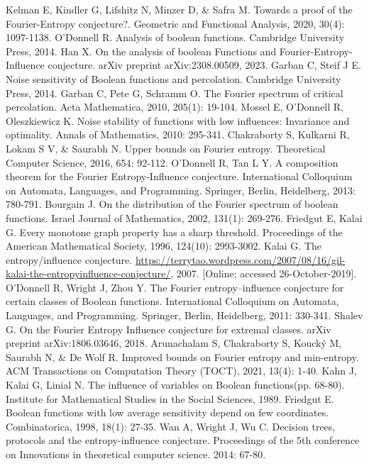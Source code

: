 \documentclass[10pt]{article} \usepackage[utf8]{inputenc}
\theoremstyle{definition}
\theoremstyle{remark}
\numberwithin{equation}{section}
\begin{document}
\raggedright
\sloppy
\begin{thebibliography}{19}
Kelman E, Kindler G, Lifshitz N, Minzer D, \& Safra M. Towards a proof of the Fourier-Entropy conjecture?. Geometric and Functional Analysis, 2020, 30(4): 1097-1138.
O'Donnell R. Analysis of boolean functions. Cambridge University Press, 2014.
Han X. On the analysis of boolean Functions and Fourier-Entropy-Influence conjecture. arXiv preprint arXiv:2308.00509, 2023.
Garban C, Steif J E. Noise sensitivity of Boolean functions and percolation. Cambridge University Press, 2014.
Garban C, Pete G, Schramm O. The Fourier spectrum of critical percolation. Acta Mathematica, 2010, 205(1): 19-104.
Mossel E, O'Donnell R, Oleszkiewicz K. Noise stability of functions with low influences: Invariance and optimality. Annals of Mathematics, 2010: 295-341.
Chakraborty S, Kulkarni R, Lokam S V, \& Saurabh N. Upper bounds on Fourier entropy. Theoretical Computer Science, 2016, 654: 92-112.
O’Donnell R, Tan L Y. A composition theorem for the Fourier Entropy-Influence conjecture. International Colloquium on Automata, Languages, and Programming. Springer, Berlin, Heidelberg, 2013: 780-791.
Bourgain J. On the distribution of the Fourier spectrum of boolean functions. Israel Journal of Mathematics, 2002, 131(1): 269-276.
Friedgut E, Kalai G. Every monotone graph property has a sharp threshold. Proceedings of the American Mathematical Society, 1996, 124(10): 2993-3002.
Kalai G. The entropy/influence conjecture. \url{https://terrytao.wordpress.com/2007/08/16/gil-kalai-the-entropyinfluence-conjecture/}, 2007. [Online; accessed 26-October-2019].
O’Donnell R, Wright J, Zhou Y. The Fourier entropy–influence conjecture for certain classes of Boolean functions. International Colloquium on Automata, Languages, and Programming. Springer, Berlin, Heidelberg, 2011: 330-341.
Shalev G. On the Fourier Entropy Influence conjecture for extremal classes. arXiv preprint arXiv:1806.03646, 2018. 
Arunachalam S, Chakraborty S, Koucký M, Saurabh N, \& De Wolf R.  Improved bounds on Fourier entropy and min-entropy. ACM Transactions on Computation Theory (TOCT), 2021, 13(4): 1-40.
Kahn J, Kalai G, Linial N. The influence of variables on Boolean functions(pp. 68-80). Institute for Mathematical Studies in the Social Sciences, 1989.
Friedgut E. Boolean functions with low average sensitivity depend on few coordinates. Combinatorica, 1998, 18(1): 27-35.
Wan A, Wright J, Wu C. Decision trees, protocols and the entropy-influence conjecture. Proceedings of the 5th conference on Innovations in theoretical computer science. 2014: 67-80.
\end{thebibliography}
\end{document}
